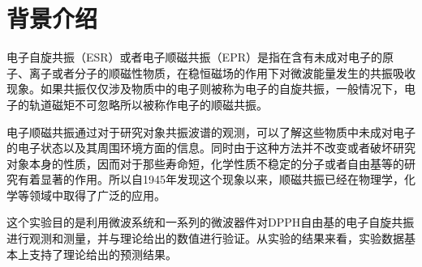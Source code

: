 %
\chapter*{背景介绍}
\label{sec:acknowledgement}
\vspace*{-10mm}

电子自旋共振（ESR）或者电子顺磁共振（EPR）是指在含有未成对电子的原子、离子或者分子的顺磁性物质，在稳恒磁场的作用下对微波能量发生的共振吸收现象。如果共振仅仅涉及物质中的电子则被称为电子的自旋共振，一般情况下，电子的轨道磁矩不可忽略所以被称作电子的顺磁共振。

电子顺磁共振通过对于研究对象共振波谱的观测，可以了解这些物质中未成对电子的电子状态以及其周围环境方面的信息。同时由于这种方法并不改变或者破坏研究对象本身的性质，因而对于那些寿命短，化学性质不稳定的分子或者自由基等的研究有着显著的作用。所以自1945年发现这个现象以来，顺磁共振已经在物理学，化学等领域中取得了广泛的应用。

这个实验目的是利用微波系统和一系列的微波器件对DPPH自由基的电子自旋共振进行观测和测量，并与理论给出的数值进行验证。从实验的结果来看，实验数据基本上支持了理论给出的预测结果。
